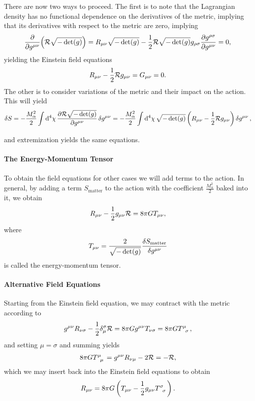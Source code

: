 There are now two ways to proceed. The first is to note that the Lagrangian density has no functional dependence on the derivatives of the metric, implying that its derivatives with respect to the metric are zero, implying
\begin{align*}
	\pdv{g^{\mu\nu}}(\mathcal{R}\sqrt{-\det(g)}) = R_{\mu\nu}\sqrt{-\det(g)} - \frac{1}{2}\mathcal{R}\sqrt{-\det(g)}g_{\rho\sigma}\pdv{g^{\rho\sigma}}{g^{\mu\nu}} = 0,
\end{align*}
yielding the Einstein field equations
\begin{align*}
	R_{\mu\nu} - \frac{1}{2}\mathcal{R} g_{\mu\nu} = G_{\mu\nu} = 0.
\end{align*}
The other is to consider variations of the metric and their impact on the action. This will yield
\begin{align*}
	\var{S} = -\frac{M_{\alpha}^{2}}{2}\int\limits_{}^{}\dd[4]{\chi}\pdv{\ensuremath{\mathcal{R}}\sqrt{-\det(g)}}{g^{\mu\nu}}\var{g^{\mu\nu}} = -\frac{M_{\alpha}^{2}}{2}\int\limits_{}^{}\dd[4]{\chi}\sqrt{-\det(g)}\left(R_{\mu\nu} - \frac{1}{2}\mathcal{R} g_{\mu\nu}\right)\var{g^{\mu\nu}},
\end{align*}
and extremization yields the same equations.

\paragraph{The Energy-Momentum Tensor}
To obtain the field equations for other cases we will add terms to the action. In general, by adding a term $S_{\text{matter}}$ to the action with the coefficient $\frac{M_{\alpha}^{2}}{2}$ baked into it, we obtain
\begin{align*}
	R_{\mu\nu} - \frac{1}{2}g_{\mu\nu}\mathcal{R} = 8\pi GT_{\mu\nu},
\end{align*}
where
\begin{align*}
	T_{\mu\nu} = \frac{2}{\sqrt{-\det(g)}}\fdv{S_{\text{matter}}}{g^{\mu\nu}}
\end{align*}
is called the energy-momentum tensor.

\paragraph{Alternative Field Equations}
Starting from the Einstein field equation, we may contract with the metric according to
\begin{align*}
	g^{\mu\nu}R_{\nu\sigma} - \frac{1}{2}\kdelta{\sigma}{\mu}\R = 8\pi Gg^{\mu\nu}T_{\nu\sigma} = 8\pi G\tensor{T}{^{\mu}_{\sigma}},
\end{align*}
and setting $\mu = \sigma$ and summing yields
\begin{align*}
	8\pi G\tensor{T}{^{\mu}_{\mu}} = g^{\mu\nu}R_{\nu\mu} - 2\R = -\R,
\end{align*}
which we may insert back into the Einstein field equations to obtain
\begin{align*}
	R_{\mu\nu} = 8\pi G\left(T_{\mu\nu} - \frac{1}{2}g_{\mu\nu}\tensor{T}{^{\sigma}_{\sigma}}\right).
\end{align*}

